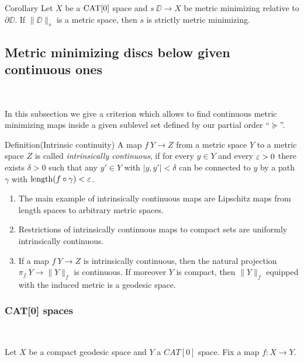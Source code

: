 \documentclass[a4paper,10pt]{amsart}
\begin{document}
\begin{thm}{Corollary}\label{prop:strict-mm}
Let  $X$ be a $\mathop{\rm CAT}\nolimits[0]$ space and $s\:\DD\to X$ be metric minimizing relative to $\partial\DD$. 
If $\|\DD\|_s$ is a metric space, then $s$ is strictly metric minimizing.
\end{thm}



\subsection{Metric minimizing discs below given continuous ones}~

In this subsection we give a criterion which allows to 
find continuous metric minimizing maps inside a given sublevel set defined by our partial order ``$\succcurlyeq$''.

\begin{thm}{Definition}(Intrinsic continuity)
A map $f\:Y\to Z$ from a metric space $Y$ to a metric space
 $Z$ is called
{\em intrinsically continuous}, if for every $y\in Y$ 
and every $\varepsilon>0$ there
exists $\delta>0$ such that any  $y'\in Y$
with $|y,y'|<\delta$ can be connected to $y$ by a path $\gamma$ 
with $\mathop{\rm length}\nolimits(f\circ\gamma)<\varepsilon$.
\end{thm}

\begin{enumerate}
 \item The main example of intrinsically continuous maps are Lipschitz
maps from length spaces to arbitrary metric spaces.
\item Restrictions of intrinsically continuous maps to compact sets are uniformly intrinsically continuous. 
\item If a map $f\:Y\to Z$ is intrinsically continuous, then 
the natural projection $\pi_f\:Y\rightarrow \|Y\|_f$ is continuous. If
moreover $Y$ is compact, then $\|Y\|_f$ equipped with the induced 
metric is a geodesic space.
\end{enumerate}



\subsubsection{CAT[0] spaces}~

\medskip

Let $X$ be a compact geodesic space and $Y$ a $CAT[0]$ space. Fix a map  
$f:X\to Y$.
\end{document}
